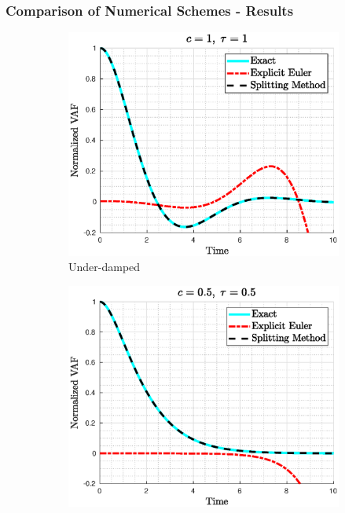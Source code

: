 \documentclass[a4paper,10pt]{beamer}
\begin{document}
	\begin{frame}
		\footnotesize
		\frametitle{Comparison of Numerical Schemes - Results}
		\begin{figure}[H]
			\centering
			\begin{subfigure}[b]{0.326\linewidth}
				\includegraphics[width=\linewidth]{./Plots/CaseStudy/Underdamped.eps}
				\caption{Under-damped}
			\end{subfigure}
			\begin{subfigure}[b]{0.326\linewidth}
				\includegraphics[width=\linewidth]{./Plots/CaseStudy/Criticallydamped.eps}

\end{subfigure}
\end{figure}
\end{frame}
\end{document}
